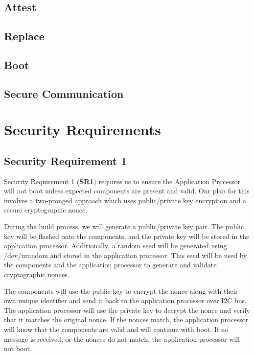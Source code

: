 \documentclass{prace}
\begin{document}
\subsection{Attest}



\subsection{Replace}



\subsection{Boot}



\subsection{Secure Communication}



\section{Security Requirements}

\subsection{Security Requirement 1}
Security Requirement 1 (\textbf{SR1}) requires us to ensure the Application Processor will not boot unless
expected components are present and valid. Our plan for this involves a two-pronged approach
which uses public/private key encryption and a secure cryptographic nonce.

During the build process, we will generate a public/private key pair. The public key will be
flashed onto the components, and the private key will be stored in the application processor.
Additionally, a random seed will be generated using /dev/urandom and stored in the application
processor. This seed will be used by the components and the application processor to generate
and validate cryptographic nonces.

The components will use the public key to encrypt the nonce along with their own
unique identifier and send it back to the application processor over I2C bus. The application
processor will use the private key to decrypt the nonce and verify that it matches the original
nonce. If the nonces match, the application processor will know that the components are valid
and will continue with boot. If no message is received, or the nonces do not match, the application
processor will not boot.
\end{document}
